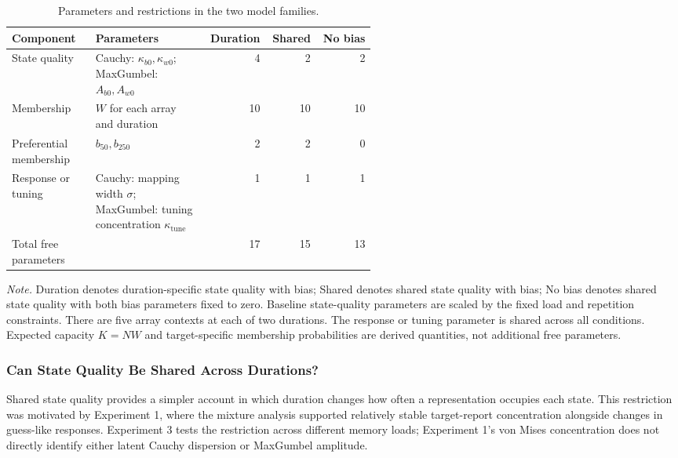 \begin{table}[htbp]
\centering
\caption{Parameters and restrictions in the two model families.}
\label{tab:exp3_parameter_structure}
\small
\begin{tabular}{p{0.23\linewidth}p{0.31\linewidth}rrr}
\hline
Component & Parameters & Duration & Shared & No bias \\
\hline
State quality & Cauchy: $\kappa_{b0},\kappa_{w0}$; MaxGumbel: $A_{b0},A_{w0}$ & 4 & 2 & 2 \\
Membership & $W$ for each array and duration & 10 & 10 & 10 \\
Preferential membership & $b_{50},b_{250}$ & 2 & 2 & 0 \\
Response or tuning & Cauchy: mapping width $\sigma$; MaxGumbel: tuning concentration $\kappa_{\mathrm{tune}}$ & 1 & 1 & 1 \\
\hline
Total free parameters & & 17 & 15 & 13 \\
\hline
\end{tabular}
\par\smallskip
\begin{minipage}{0.97\linewidth}
\small\textit{Note.} Duration denotes duration-specific state quality with bias; Shared denotes shared state quality with bias; No bias denotes shared state quality with both bias parameters fixed to zero. Baseline state-quality parameters are scaled by the fixed load and repetition constraints. There are five array contexts at each of two durations. The response or tuning parameter is shared across all conditions. Expected capacity $K=NW$ and target-specific membership probabilities are derived quantities, not additional free parameters.
\end{minipage}
\end{table}

\subsubsection{Can State Quality Be Shared Across Durations?}

Shared state quality provides a simpler account in which duration changes how often a representation occupies each state. This restriction was motivated by Experiment 1, where the mixture analysis supported relatively stable target-report concentration alongside changes in guess-like responses. Experiment 3 tests the restriction across different memory loads; Experiment 1's von Mises concentration does not directly identify either latent Cauchy dispersion or MaxGumbel amplitude.

